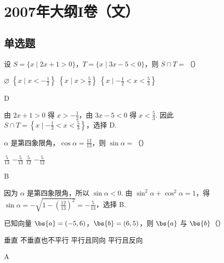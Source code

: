 \chapter{2007年大纲I卷（文）}

\section{单选题}

\begin{problem}
设 \(S = \{x \mid 2x + 1 > 0\}\)，\(T = \{x \mid 3x - 5 < 0\}\)，则 \(S \cap T =\)（\quad）

\choices
    {\(\varnothing\)}
    {\(\left\{x\mid x < -\frac{1}{2}\right\}\)}
    {\(\left\{x\mid x > \frac{5}{3}\right\}\)}
    {\(\left\{x\mid -\frac{1}{2} < x < \frac{5}{3}\right\}\)}
\end{problem}

\begin{answer}
D
\end{answer}

\begin{solution}
由 \(2x+1>0\) 得 \(x>-\frac{1}{2}\)，由 \(3x-5<0\) 得 \(x<\frac{5}{3}\). 因此
\(S\cap T=\left\{x\mid -\frac{1}{2}<x<\frac{5}{3}\right\}\)，选择 D.
\end{solution}

\begin{problem}
\(\alpha\) 是第四象限角，\(\cos \alpha = \frac{12}{13}\)，则 \(\sin \alpha =\)（\quad）

\choices
    {\(\frac{5}{13}\)}
    {\(-\frac{5}{13}\)}
    {\(\frac{5}{12}\)}
    {\(-\frac{5}{12}\)}
\end{problem}

\begin{answer}
B
\end{answer}

\begin{solution}
因为 \(\alpha\) 是第四象限角，所以 \(\sin\alpha<0\). 由
\(\sin^2\alpha+\cos^2\alpha=1\)，得
\(\sin\alpha=-\sqrt{1-\left(\frac{12}{13}\right)^2}=-\frac{5}{13}\)，选择 B.
\end{solution}

\begin{problem}
已知向量 \(\bs{a} = (-5, 6)\)，\(\bs{b} = (6, 5)\)，则 \(\bs{a}\) 与 \(\bs{b}\)（\quad）

\choices
    {垂直}
    {不垂直也不平行}
    {平行且同向}
    {平行且反向}
\end{problem}

\begin{answer}
A
\end{answer}

